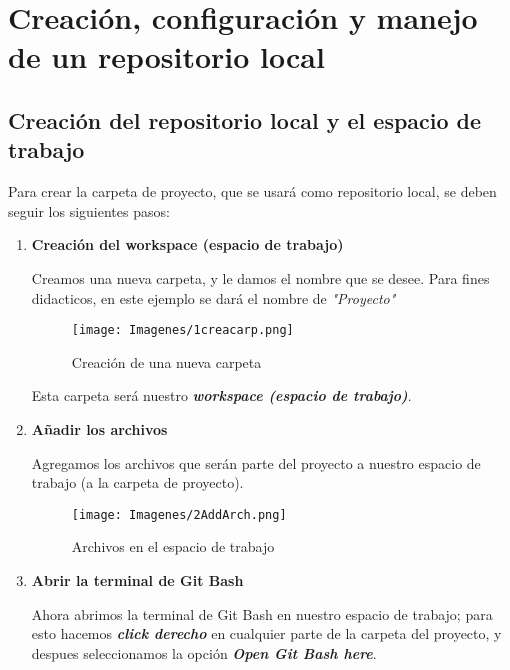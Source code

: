 \chapter{Creación, configuración y manejo de un repositorio local}

\section{Creación del repositorio local y el espacio de trabajo}

Para crear la carpeta de proyecto, que se usará como repositorio local, se deben seguir los siguientes pasos:

\begin{enumerate}

    \item \textbf{Creación del workspace (espacio de trabajo)}
    
        Creamos una nueva carpeta, y le damos el nombre que se desee. Para fines didacticos, en este ejemplo se dará el nombre de \textit{"Proyecto"}
        
        \begin{figure}[H]
            \centering
            \texttt{[image: Imagenes/1creacarp.png]}
            \caption{Creación de una nueva carpeta}
            \label{}
        \end{figure}

        Esta carpeta será nuestro \textit{\textbf{workspace (espacio de trabajo)}}.
        
    \item \textbf{Añadir los archivos}
    
    Agregamos los archivos que serán parte del proyecto a nuestro espacio de trabajo (a la carpeta de proyecto).
        
        \begin{figure}[H]
            \centering
            \texttt{[image: Imagenes/2AddArch.png]}
            \caption{Archivos en el espacio de trabajo}
            \label{}
        \end{figure}

    \item \textbf{Abrir la terminal de Git Bash}
    
    Ahora abrimos la terminal de Git Bash en nuestro espacio de trabajo; para esto hacemos \textbf{\textit{click derecho}} en cualquier parte de la carpeta del proyecto, y despues seleccionamos la opción \textbf{\textit{Open Git Bash here}}.
        

\end{enumerate}
